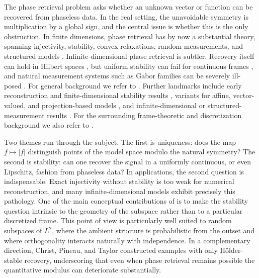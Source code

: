 \documentclass[11pt]{amsart}
\numberwithin{equation}{section}
\theoremstyle{definition}
\theoremstyle{remark}
\begin{document}
The phase retrieval problem asks whether an unknown vector or function can be
recovered from phaseless data.  In the real setting, the unavoidable symmetry
is multiplication by a global sign, and the central issue is whether this is
the only obstruction.  In finite dimensions, phase retrieval has by now a
substantial theory, spanning injectivity, stability, convex relaxations,
random measurements, and structured models
\cite{bandeira2014saving,eldar2014stability,MR3069958,MR3260258,KS,DB}.
Infinite-dimensional phase retrieval is subtler.  Recovery itself can hold in
Hilbert spaces \cite{cahill2016infinite}, but uniform stability can fail for
continuous frames \cite{alaifari2017continuous}, and natural measurement
systems such as Gabor families can be severely ill-posed
\cite{alaifari2021gabor,grohs2021stable,grohs20212,steinerberger2020stability}.
For general background we refer to \cite{grohs2020survey}.
Further landmarks include early reconstruction and finite-dimensional stability
results
\cite{sanz1984phase,ramos-sousa-pauli,balan2013,bandeira2014saving,eldar2014stability,MR3069958,MR3260258,KS,DB,MR3746047},
variants for affine, vector-valued, and projection-based models
\cite{bartusel2021phase,chen2019phase,casazza2013,casazza2017weak,casazza2017norm,akrami2021note},
and infinite-dimensional or structured-measurement results
\cite{calderbank2022stable,localphase,MR4298599}.
For the surrounding frame-theoretic and discretization background we also refer
to
\cite{AG-continuous-frames,CHL,CCS-JMAA,CDOS,FG-atomic,MR3275625,MR3367650,MR3901674,fg22,kashin2021sampling,LT21,DPSTT,NOU,MR2011364,MR0423039,luef2021gaussian}.

Two themes run through the subject.  The first is uniqueness: does the map
$f\mapsto |f|$ distinguish points of the model space modulo the natural
symmetry?  The second is stability: can one recover the signal in a uniformly
continuous, or even Lipschitz, fashion from phaseless data?  In applications,
the second question is indispensable.  Exact injectivity without stability is
too weak for numerical reconstruction, and many infinite-dimensional models
exhibit precisely this pathology.  One of the main conceptual contributions of
\cite{FOTP} is to make the stability question intrinsic to the geometry of the
subspace rather than to a particular discretized frame.  This point of view is
particularly well suited to random subspaces of $L^2$, where the ambient
structure is probabilistic from the outset and where orthogonality interacts
naturally with independence.  In a complementary direction, Christ, Pineau,
and Taylor \cite{christ2022examples} constructed examples with only
H\"older-stable recovery, underscoring that even when phase retrieval remains
possible the quantitative modulus can deteriorate substantially.
\end{document}
